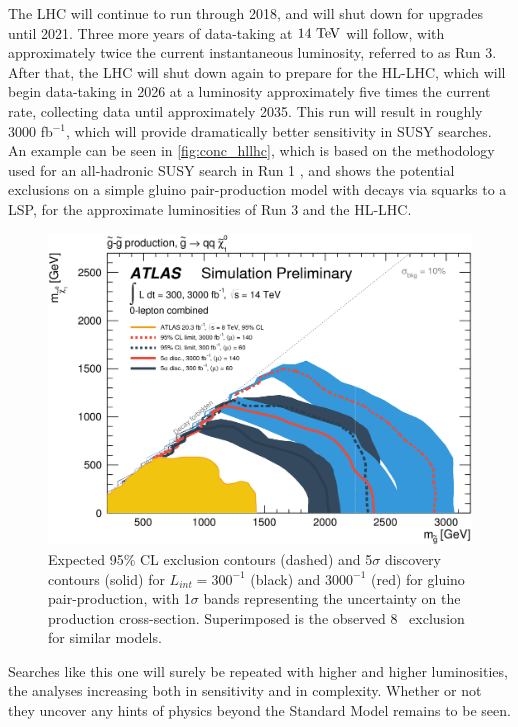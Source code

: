 The \ac{LHC} will continue to run through 2018, and will shut down for upgrades until 2021. Three more years of data-taking at $14\tev$ will follow, with approximately twice the current instantaneous luminosity, referred to as Run 3. After that, the \ac{LHC} will shut down again to prepare for the \ac{HL-LHC}, which will begin data-taking in 2026 at a luminosity approximately five times the current rate, collecting data until approximately 2035. This run will result in roughly 3000 fb$^{-1}$, which will provide dramatically better sensitivity in \ac{SUSY} searches. An example can be seen in \autoref{fig:conc_hllhc}, which is based on the methodology used for an all-hadronic \ac{SUSY} search in Run 1 \cite{Aad:2014wea}, and shows the potential exclusions on a simple gluino pair-production model with decays via squarks to a \ac{LSP}, for the approximate luminosities of Run 3 and the \ac{HL-LHC}. 

\begin{figure}[!htb]
\centering
\includegraphics[width=.9\textwidth]{figures/interpretation/fig_09a.png}
\caption{ Expected 95\% \ac{CL} exclusion contours (dashed) and 5$\sigma$ discovery contours (solid) for $L_{int} = 300^{-1}$ (black) and $3000^{-1}$ (red) for gluino pair-production, with 1$\sigma$ bands representing the uncertainty on the production cross-section. Superimposed is the observed 8 \tev~exclusion for similar models. \cite{ATL-PHYS-PUB-2014-010}}
\label{fig:conc_hllhc}
\end{figure}

Searches like this one will surely be repeated with higher and higher luminosities, the analyses increasing both in sensitivity and in complexity. Whether or not they uncover any hints of physics beyond the Standard Model remains to be seen. 




